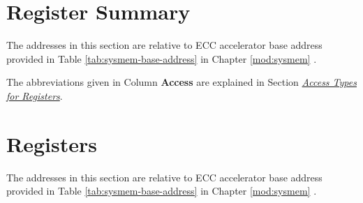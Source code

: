 \documentclass[main\_\_EN.tex]{subfiles}
\begin{document}
\clearpage
\hypertarget{ecc-reg-summ}{}
\section{Register Summary}
\label{sec:ecc-reg-summ}

The addresses in this section are relative to ECC accelerator base address provided in Table \ref{tab:sysmem-base-address} in Chapter \ref{mod:sysmem} \textit{}.

The abbreviations given in Column \textbf{Access} are explained in Section \hyperref[glossary-access-types]{\textit{Access Types for Registers}}.






\clearpage
\section{Registers}

The addresses in this section are relative to ECC accelerator base address provided in Table \ref{tab:sysmem-base-address} in Chapter \ref{mod:sysmem} \textit{}.


\end{document}
